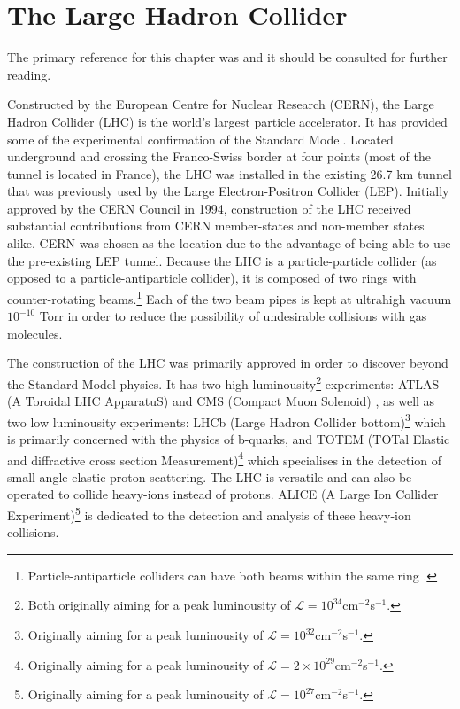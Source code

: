 \chapter{The Large Hadron Collider}
The primary reference for this chapter was \cite{LHC} and it should be consulted for further reading.

Constructed by the European Centre for Nuclear Research (CERN), the Large Hadron Collider (LHC) \cite{LHC} is the world's largest particle accelerator. It has provided some of the experimental confirmation of the Standard Model. Located underground and crossing the Franco-Swiss border at four points (most of the tunnel is located in France), the LHC was installed in the existing 26.7 km tunnel that was previously used by the Large Electron-Positron Collider (LEP). Initially approved by the CERN Council in 1994, construction of the LHC received substantial contributions from CERN member-states and non-member states alike. CERN was chosen as the location due to the advantage of being able to use the pre-existing LEP tunnel. Because the LHC is a particle-particle collider (as opposed to a particle-antiparticle collider), it is composed of two rings with counter-rotating beams.\footnote{Particle-antiparticle colliders can have both beams within the same ring \cite{LHC}.} Each of the two beam pipes is kept at ultrahigh vacuum $10^{-10}$ Torr \cite{vacuum} in order to reduce the possibility of undesirable collisions with gas molecules.

The construction of the LHC was primarily approved in order to discover beyond the Standard Model physics. It has two high luminousity\footnote{Both originally aiming for a peak luminousity of $\mathcal{L} = 10^{34}$cm$^{-2}$s$^{-1}$.} experiments: ATLAS (A Toroidal LHC ApparatuS) \cite{ATLAS} and CMS (Compact Muon Solenoid) \cite{CMS}, as well as two low luminousity experiments: LHCb (Large Hadron Collider bottom)\footnote{Originally aiming for a peak luminousity of $\mathcal{L} = 10^{32}$cm$^{-2}$s$^{-1}$.} \cite{LHCb} which is primarily concerned with the physics of b-quarks, and TOTEM (TOTal Elastic and diffractive cross section Measurement)\footnote{Originally aiming for a peak luminousity of $\mathcal{L} = 2 \times 10^{29}$cm$^{-2}$s$^{-1}$.} \cite{TOTEM} which specialises in the detection of small-angle elastic proton scattering.  The LHC is versatile and can also be operated to collide heavy-ions instead of protons. ALICE (A Large Ion Collider Experiment)\footnote{Originally aiming for a peak luminousity of $\mathcal{L} = 10^{27}$cm$^{-2}$s$^{-1}$.} \cite{ALICE} is dedicated to the detection and analysis of these heavy-ion collisions.


